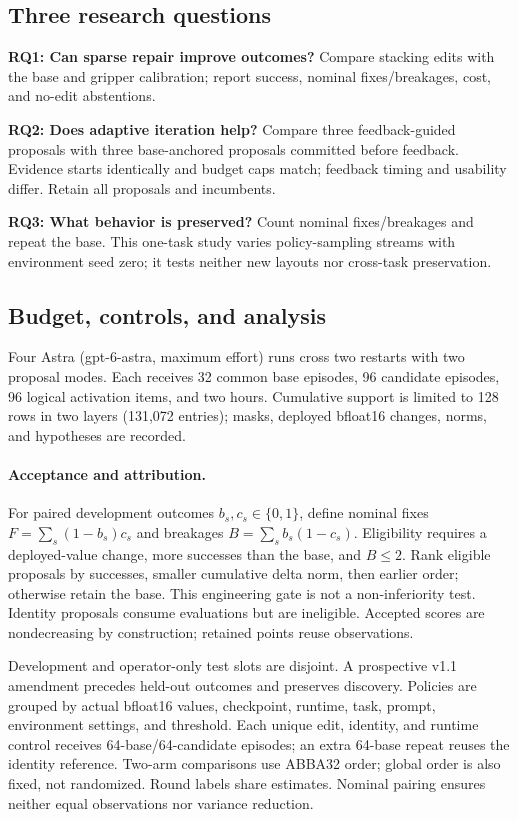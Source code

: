 \subsection{Three research questions}
\textbf{RQ1: Can sparse repair improve outcomes?} Compare stacking edits with the base and gripper calibration; report success, nominal fixes/breakages, cost, and no-edit abstentions.

\textbf{RQ2: Does adaptive iteration help?} Compare three feedback-guided proposals with three base-anchored proposals committed before feedback. Evidence starts identically and budget caps match; feedback timing and usability differ. Retain all proposals and incumbents.

\textbf{RQ3: What behavior is preserved?} Count nominal fixes/breakages and repeat the base. This one-task study varies policy-sampling streams with environment seed zero; it tests neither new layouts nor cross-task preservation.

\subsection{Budget, controls, and analysis}
Four Astra (\textnormal{gpt-6-astra}, maximum effort) runs cross two restarts with two proposal modes. Each receives 32 common base episodes, 96 candidate episodes, 96 logical activation items, and two hours. Cumulative support is limited to 128 rows in two layers (131,072 entries); masks, deployed bfloat16 changes, norms, and hypotheses are recorded. 

\paragraph{Acceptance and attribution.}
For paired development outcomes $b_s,c_s\in\{0,1\}$, define nominal fixes $F=\sum_s(1-b_s)c_s$ and breakages $B=\sum_s b_s(1-c_s)$. Eligibility requires a deployed-value change, more successes than the base, and $B\leq2$. Rank eligible proposals by successes, smaller cumulative delta norm, then earlier order; otherwise retain the base. This engineering gate is not a non-inferiority test. Identity proposals consume evaluations but are ineligible. Accepted scores are nondecreasing by construction; retained points reuse observations.

Development and operator-only test slots are disjoint. A prospective v1.1 amendment precedes held-out outcomes and preserves discovery. Policies are grouped by actual bfloat16 values, checkpoint, runtime, task, prompt, environment settings, and threshold. Each unique edit, identity, and runtime control receives 64-base/64-candidate episodes; an extra 64-base repeat reuses the identity reference. Two-arm comparisons use ABBA32 order; global order is also fixed, not randomized. Round labels share estimates. Nominal pairing ensures neither equal observations nor variance reduction.

